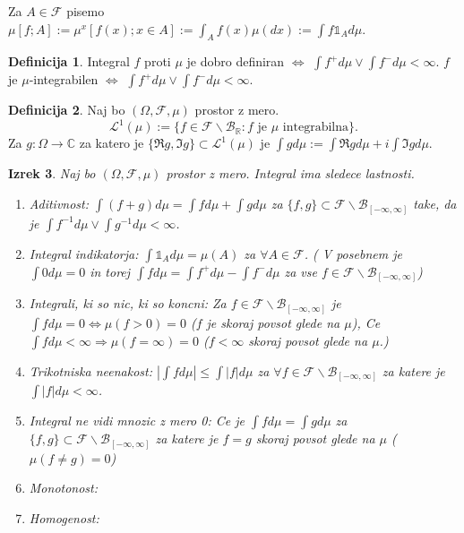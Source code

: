 \documentclass[a4paper,12pt]{article}
\theoremstyle{definition} %
\newtheorem{definicija}{Definicija}[section]
\theoremstyle{plain} %
\newtheorem{izrek}[definicija]{Izrek}
\newcommand{\R}{\mathbb{R}}
\newcommand{\F}{\mathcal{F}}
\begin{document}
            Za $A \in \F$ pisemo $\mu[f;A]:= \mu^x[f(x);x \in A]:= \int_A f(x)\mu(dx):= \int f\mathds{1}_Ad\mu$.

            \begin{definicija}
                Integral $f$ proti $\mu$ je dobro definiran $\iff$ $\int f^+d\mu \vee \int f^-d\mu < \infty$.
                $f$ je $\mu$-integrabilen $\iff $ $\int f^+d\mu \vee \int f^-d\mu < \infty$.
            \end{definicija}

            \begin{definicija}
                Naj bo $(\Omega, \F, \mu)$ prostor z mero. 
                $$
                    \mathcal{L}^1(\mu) := \{f \in \F\backslash\mathcal{B}_{\R}: \text{$f$ je $\mu$ integrabilna}\}. 
                $$
                Za $g:\Omega \rightarrow \mathbb{C}$ za katero je $\{\Re g, \Im g\} \subset \mathcal{L}^1(\mu)$ je 
                $\int g d\mu:= \int \Re gd\mu + i\int \Im gd\mu$.
            \end{definicija}

            \begin{izrek}
                Naj bo $(\Omega, \F, \mu)$ prostor z mero. Integral ima sledece lastnosti.
                \begin{enumerate}
                    \item Aditivnost: $\int (f + g)d\mu = \int fd\mu + \int gd\mu$ za $\{f, g\} \subset \F\backslash\mathcal{B}_{[-\infty, \infty]}$ take, da je $\int f^{-1}d\mu \vee \int g^{-1}d\mu < \infty$.
                    \item Integral indikatorja: $\int \mathds{1}_Ad\mu = \mu(A)$ za $\forall A \in \F$. ( V posebnem je $\int 0 d\mu = 0$ in torej $\int fd\mu = \int f^{+}d\mu - \int f^{-}d\mu$ za vse $f \in \F\backslash\mathcal{B}_{[-\infty, \infty]}$)
                    \item Integrali, ki so nic, ki so koncni: Za $f \in \F\backslash\mathcal{B}_{[-\infty, \infty]}$ je $\int f d\mu = 0 \iff \mu(f >0)= 0$ ($f$ je skoraj povsot glede na $\mu$), Ce $\int f d\mu < \infty \Rightarrow \mu(f = \infty) = 0$ ($f < \infty$ skoraj povsot glede na $\mu$.)
                    \item Trikotniska neenakost: $\left|\int fd\mu\right| \leq \int |f|d\mu$ za $\forall f \in \F\backslash\mathcal{B}_{[-\infty, \infty]}$ za katere je $\int |f|d\mu < \infty$.
                    \item Integral ne vidi mnozic z mero 0: Ce je $\int fd\mu = \int gd\mu$ za $\{f, g\} \subset \F\backslash\mathcal{B}_{[-\infty, \infty]}$ za katere je $f = g$ skoraj povsot glede na $\mu$ ($\mu(f \neq g) = 0$)
                    \item Monotonost:
                    \item Homogenost:                
                    
                
                \end{enumerate}
            \end{izrek}
\end{document}
